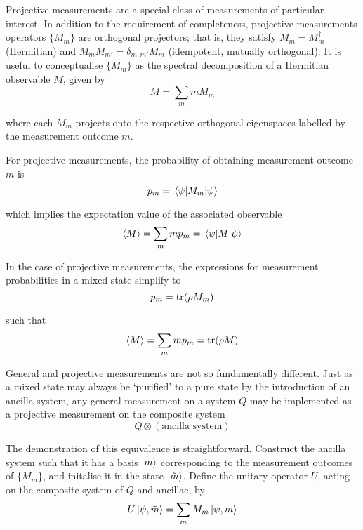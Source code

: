 \documentclass[10pt]{article}
\begin{document}
Projective measurements are a special class of measurements of particular interest. In addition to the requirement of completeness, projective measurements operators $\{M_m\}$ are orthogonal projectors; that is, they satisfy $M_m = M_m^\dagger$ (Hermitian) and $M_m M_{m'}  = \delta_{m,m'} M_m$ (idempotent, mutually orthogonal). It is useful to conceptualise $\{M_m\}$ as the spectral decomposition of a Hermitian observable $M$, given by
\begin{equation}
M = \sum_m m M_m
\end{equation}

where each $M_m$ projects onto the respective orthogonal eigenspaces labelled by the measurement outcome $m$.

For projective measurements, the probability of obtaining measurement outcome $m$ is 
\begin{equation}
p_m = \ev{M_m}{\psi}
\end{equation} 

which implies the expectation value of the associated observable
\begin{equation}
\ev{M} 
= \sum_m m p_m
= \ev{M}{\psi}
\end{equation} 

In the case of projective measurements, the expressions for measurement probabilities in a mixed state simplify to
\begin{equation}
p_m = \trace(\rho M_m)
\end{equation}

such that 
\begin{equation}
\ev{M} = \sum_m m p_m = \trace(\rho M)
\end{equation}

General and projective measurements are not so fundamentally different. Just as a mixed state may always be `purified' to a pure state by the introduction of an ancilla system, any general measurement on a system $Q$ may be implemented as a projective measurement on the composite system
\begin{equation}
Q \otimes (\text{ancilla system})
\end{equation}

The demonstration of this equivalence is straightforward. Construct the ancilla system such that it has a basis $\ket{m}$ corresponding to the measurement outcomes of $\{M_m\}$, and initalise it in the state $\ket{\tilde{m}}$. Define the unitary operator $U$, acting on the composite system of $Q$ and ancillae, by
\begin{equation}
U \ket{\psi, \tilde{m}} = \sum_m M_m \ket{\psi, m}
\end{equation}
\end{document}
